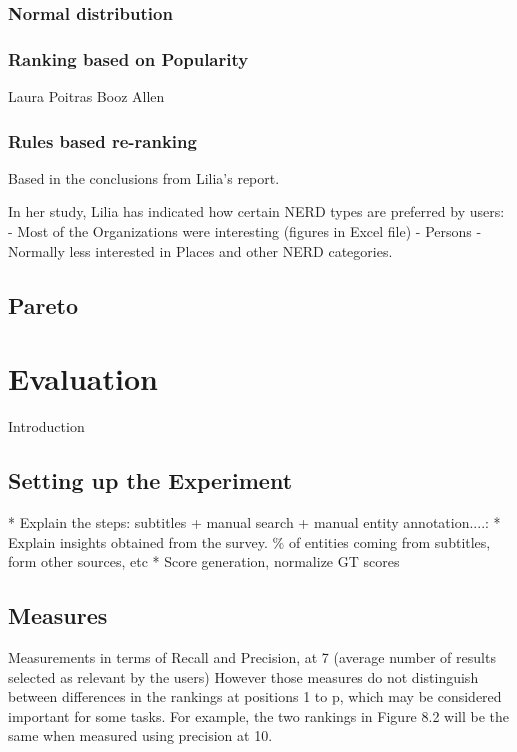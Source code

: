 \documentclass{llncs}
\begin{document}
\subsubsection{Normal distribution}

\subsubsection{Ranking based on Popularity}
Laura Poitras
Booz Allen

\subsubsection{Rules based re-ranking}
Based in the conclusions from Lilia's report. 

In her study, Lilia has indicated how certain NERD types are preferred by users:
- Most of the Organizations were interesting (figures in Excel file)
- Persons
- Normally less interested in Places and other NERD categories.

\subsection{Pareto}


\section{Evaluation}
\label{sec:Evaluation}
Introduction

\subsection{Setting up the Experiment}
\label{sec:settingUp}


* Explain the steps: subtitles + manual search + manual  entity annotation....:
* Explain insights obtained from the survey. \% of entities coming from subtitles, form other sources, etc
* Score generation, normalize GT scores

\subsection{Measures}
Measurements in terms of Recall and Precision, at 7 (average number of results selected as relevant by the users)
However those measures do not distinguish between differences in the rankings at positions 1 to p, which may be considered important for some tasks. For example, the two rankings in Figure 8.2 will be the same when measured using precision at 10.
\end{document}
